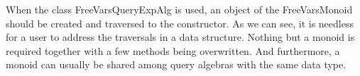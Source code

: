 When the class FreeVarsQueryExpAlg is used, an object of the FreeVarsMonoid should be created and traversed to the constructor. As we can see, it is needless for a user to address the traversals in a data structure. Nothing but a monoid is required together with a few methods being overwritten. And furthermore, a monoid can usually be shared among query algebras with the same data type.





\begin{comment}
How to write generic queries by hand

Introduce Monoid
\begin{lstlisting}[numbers=none]
public interface Monoid<R> {
    R join(R x, R y);
    R empty();
    default R fold(List<R> lr){
    	R res = empty();
    	for (R r: lr){
    		res = join(res, r);
    	}
    	return res;
    }
}
\end{lstlisting}\bruno{Don't copy the code into this file! Please refer to the
  code in the implementation directly using the ruby script.}

Free Variables Monoid
\begin{figure}[tb]
\vspace{-.1in}
\caption{Free Variables Monoid}
\end{figure}


Generic Query by hand with Monoid

Free Vars Query
\begin{figure}[tb]
\vspace{-.1in}
\caption{Free Vars Query}
\end{figure}
\end{comment}
